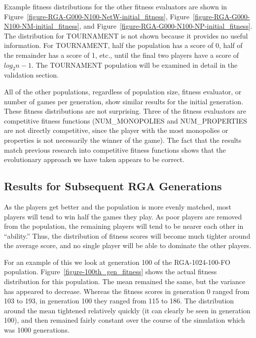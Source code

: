 Example fitness distributions for the other fitness evaluators are shown in
Figure~\ref{figure-RGA-G000-N100-NetW-initial_fitness},
Figure~\ref{figure-RGA-G000-N100-NM-initial_fitness}, and
Figure~\ref{figure-RGA-G000-N100-NP-initial_fitness}. The distribution for
TOURNAMENT is not shown because it provides no useful information. For
TOURNAMENT, half the population has a score of 0, half of the remainder has a
score of 1, etc., until the final two players have a score of \(log_{2} n-1\).
The TOURNAMENT population will be examined in detail in the validation section.

All of the other populations, regardless of population size, fitness evaluator,
or number of games per generation, show similar results for the initial
generation. These fitness distributions are not surprising. Three of the fitness
evaluators are competitive fitness functions (NUM\_MONOPOLIES and
NUM\_PROPERTIES are not directly competitive, since the player with the most
monopolies or properties is not necessarily the winner of the game). The fact
that the results match previous research into competitive fitness functions
shows that the evolutionary approach we have taken appears to be correct.

\subsection{Results for Subsequent RGA Generations}

As the players get better and the population is more evenly matched, most
players will tend to win half the games they play. As poor players are removed
from the population, the remaining players will tend to be nearer each other in
``ability.'' Thus, the distribution of fitness scores will become much tighter
around the average score, and no single player will be able to dominate the
other players.

For an example of this we look at generation 100 of the RGA-1024-100-FO
population. Figure~\ref{figure-100th_gen_fitness} shows the actual fitness
distribution for this population. The mean remained the same, but the variance
has appeared to decrease. Whereas the fitness scores in generation 0 ranged from
103 to 193, in generation 100 they ranged from 115 to 186. The distribution
around the mean tightened relatively quickly (it can clearly be seen in
generation 100), and then remained fairly constant over the course of the
simulation which was 1000 generations.

